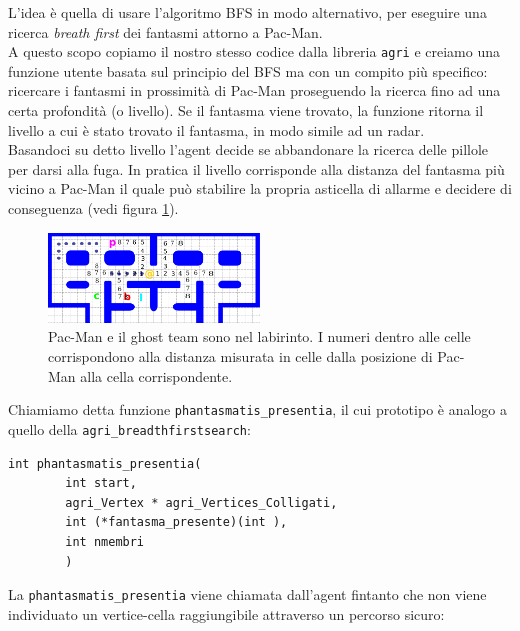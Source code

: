 \documentclass[8pt]{book}
\begin{document}
L'idea è quella di usare l'algoritmo BFS in modo alternativo, per eseguire una ricerca \emph{breath first} dei fantasmi attorno a Pac-Man.\\
A questo scopo copiamo il nostro stesso codice dalla libreria \texttt{agri} e creiamo una funzione utente basata sul principio del BFS ma con un compito più specifico: ricercare i fantasmi in prossimità di Pac-Man proseguendo la ricerca fino ad una certa profondità (o livello). Se il fantasma viene trovato, la funzione ritorna il livello a cui è stato trovato il fantasma, in modo simile ad un radar.\\
Basandoci su detto livello l'agent decide se abbandonare la ricerca delle pillole per darsi alla fuga. In pratica il livello corrisponde alla distanza del fantasma più vicino a Pac-Man il quale può stabilire la propria asticella di allarme e decidere di conseguenza (vedi figura \ref{escape_}).\\

\begin{figure}
  \centering
  \includegraphics[width=0.5\textwidth]{img/escape_.png}
  \caption{Pac-Man e il ghost team sono nel labirinto. I numeri dentro alle celle corrispondono alla distanza misurata in celle dalla posizione di Pac-Man alla cella corrispondente.}
  \label{escape_}
\end{figure}

Chiamiamo detta funzione \texttt{phantasmatis\_presentia}, il cui prototipo è analogo a quello della \texttt{agri\_breadthfirstsearch}:

\begin{spacing}{0.9}
  \begin{small}
    \begin{tcolorbox}
\begin{verbatim}
int phantasmatis_presentia(
        int start, 
        agri_Vertex * agri_Vertices_Colligati,
        int (*fantasma_presente)(int ),
        int nmembri
        )
\end{verbatim}
  \end{tcolorbox}
    \end{small}
      \end{spacing}

La \texttt{phantasmatis\_presentia} viene chiamata dall'agent fintanto che non viene individuato un vertice-cella raggiungibile attraverso un percorso sicuro:
\end{document}
